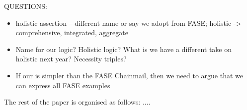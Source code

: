  QUESTIONS:
 \begin{itemize}
 \item
 holistic assertion -- different name or say we adopt from FASE; holistic -> comprehensive, integrated, aggregate 
 \item
 Name for our logic?  Holistic logic? What is we have a different take on holistic next year? Necessity triples? 
\item
If our \Chainmail is simpler than the FASE Chainmail, then we need to argue that we can express all FASE examples
 \end{itemize}
  
The rest of the paper is organised as follows: .... 

